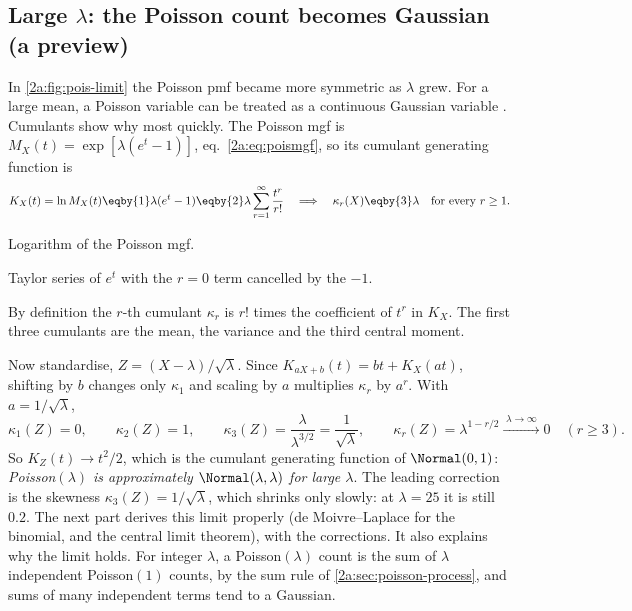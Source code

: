\subsection{Large \texorpdfstring{$\lambda$}{lambda}: the Poisson count becomes Gaussian (a preview)}\label{2a:sec:gauss-preview}

In \cref{2a:fig:pois-limit} the Poisson pmf became more symmetric as $\lambda$ grew. For a large mean, a Poisson variable can be treated as a continuous Gaussian variable . Cumulants show why most quickly. The Poisson mgf is $M_X(t)=\exp[\lambda(e^t-1)]$, eq.~\eqref{2a:eq:poismgf}, so its cumulant generating function is
\begin{align}
  K_X(t)=\ln M_X(t) \eqby{1} \lambda(e^t-1) \eqby{2} \lambda\sum_{r=1}^\infty\frac{t^r}{r!}
  \quad\Longrightarrow\quad \kappa_r(X) \eqby{3} \lambda\quad\text{for every }r\ge1. \label{2a:eq:poiscum}
\end{align}
\begin{explain}
  \item Logarithm of the Poisson mgf.
  \item Taylor series of $e^t$ with the $r=0$ term cancelled by the $-1$.
  \item By definition the $r$-th cumulant $\kappa_r$ is $r!$ times the coefficient of $t^r$ in $K_X$. The first three cumulants are the mean, the variance and the third central moment.
\end{explain}
Now standardise, $Z=(X-\lambda)/\sqrt\lambda$. Since $K_{aX+b}(t)=bt+K_X(at)$, shifting by $b$ changes only $\kappa_1$ and scaling by $a$ multiplies $\kappa_r$ by $a^r$. With $a=1/\sqrt\lambda$,
\[
  \kappa_1(Z)=0,\qquad \kappa_2(Z)=1,\qquad \kappa_3(Z)=\frac{\lambda}{\lambda^{3/2}}=\frac1{\sqrt\lambda},\qquad \kappa_r(Z)=\lambda^{1-r/2}\xrightarrow{\;\lambda\to\infty\;}0\quad(r\ge3).
\]
So $K_Z(t)\to t^2/2$, which is the cumulant generating function of $\Normal(0,1)$: \emph{Poisson$(\lambda)$ is approximately $\Normal(\lambda,\lambda)$ for large $\lambda$}. The leading correction is the skewness $\kappa_3(Z)=1/\sqrt\lambda$, which shrinks only slowly: at $\lambda=25$ it is still $0.2$. The next part derives this limit properly (de Moivre--Laplace for the binomial, and the central limit theorem), with the corrections. It also explains why the limit holds. For integer $\lambda$, a Poisson$(\lambda)$ count is the sum of $\lambda$ independent Poisson$(1)$ counts, by the sum rule of \cref{2a:sec:poisson-process}, and sums of many independent terms tend to a Gaussian.

